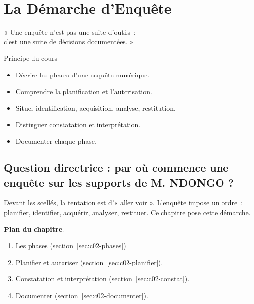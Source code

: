 
\chapter{La Démarche d'Enquête}
\label{chap:demarche}

\epigraph{%
    « Une enquête n'est pas une suite d'outils~;\\
    c'est une suite de décisions documentées. »%
}{Principe du cours}


\begin{boxobjectifs}
\begin{itemize}
    \item Décrire les phases d'une enquête numérique.
    \item Comprendre la planification et l'autorisation.
    \item Situer identification, acquisition, analyse, restitution.
    \item Distinguer constatation et interprétation.
    \item Documenter chaque phase.
\end{itemize}
\end{boxobjectifs}

\bigskip

\section*{Question directrice : par où commence une enquête sur les supports de M. NDONGO ?}

Devant les scellés, la tentation est d'« aller voir ». L'enquête impose un
ordre~: planifier, identifier, acquérir, analyser, restituer. Ce chapitre
pose cette démarche.

\medskip
\textbf{Plan du chapitre.}
\begin{enumerate}
    \item Les phases (section~\ref{sec:c02-phases}).
    \item Planifier et autoriser (section~\ref{sec:c02-planifier}).
    \item Constatation et interprétation (section~\ref{sec:c02-constat}).
    \item Documenter (section~\ref{sec:c02-documenter}).
\end{enumerate}

